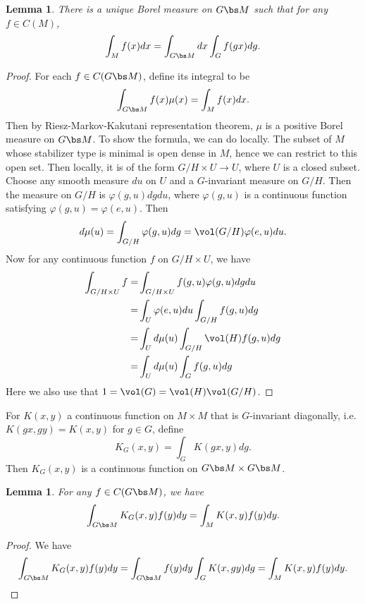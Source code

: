 \documentclass[a4paper]{amsart}
\theoremstyle{plain}
\newtheorem{lem}[thm]{Lemma}
\theoremstyle{remark} \newtheorem{remark}[thm]{Remark}
\theoremstyle{remark} \newtheorem{exercise}{Exercise}
\theoremstyle{remark} \newtheorem{example}{Example}
\numberwithin{equation}{section}
\begin{document}
\begin{lem}
	There is a unique Borel measure on $G\bs M$ such that for any $f\in C(M)$,
	\[\int_M f(x)dx=\int_{G\bs M}dx\int_Gf(gx)dg.\]
\end{lem}
\begin{proof}
	For each $f\in C(G\bs M)$, define its integral to be
	\[\int_{G\bs M}f(x)\mu(x)=\int_Mf(x)dx.\]
	Then by Riesz-Markov-Kakutani representation theorem, $\mu$ is a positive Borel measure on $G\bs M$. To show the formula, we can do locally. The subset of $M$ whose stabilizer type is minimal is open dense in $M$, hence we can restrict to this open set. Then locally, it is of the form $G/H\times U\to U$, where $U$ is a closed subset. Choose any smooth measure $du$ on $U$ and a $G$-invariant measure on $G/H$. Then the measure on $G/H$ is $\varphi(g,u)dgdu$, where $\varphi(g,u)$ is a continuous function satisfying $\varphi(g,u)=\varphi(e,u)$. Then
	\[d\mu(u)=\int_{G/H}\varphi(g,u)dg=\vol(G/H)\varphi(e,u)du.\]
	Now for any continuous function $f$ on $G/H\times U$, we have
	\begin{align*}
		\int_{G/H\times U}f=&\int_{G/H\times U}f(g,u)\varphi(g,u)dgdu\\
		=&\int_U\varphi(e,u)du\int_{G/H}f(g,u)dg\\
		=&\int_Ud\mu(u)\int_{G/H}\vol(H)f(g,u)dg\\
		=&\int_Ud\mu(u)\int_G f(g,u)dg
	\end{align*}
	Here we also use that $1=\vol(G)=\vol(H)\vol(G/H)$.
\end{proof}

For $K(x,y)$ a continuous function on $M\times M$ that is $G$-invariant diagonally, i.e. $K(gx,gy)=K(x,y)$ for $g\in G$, define
\[K_G(x,y)=\int_G K(gx,y)dg.\]
Then $K_G(x,y)$ is a continuous function on $G\bs M\times G\bs M$.

\begin{lem}
	For any $f\in C(G\bs M)$, we have
	\[\int_{G\bs M}K_G(x,y)f(y)dy=\int_MK(x,y)f(y)dy.\]
\end{lem}
\begin{proof}
	We have
	\[\int_{G\bs M}K_G(x,y)f(y)dy=\int_{G\bs M}f(y)dy\int_GK(x,gy)dg=\int_MK(x,y)f(y)dy.\]
\end{proof}

\fi




	
\end{document}
